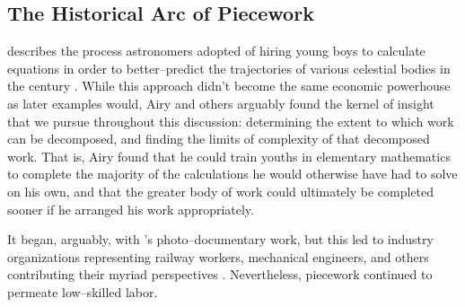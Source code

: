 \documentclass[trackingWork]{subfiles}
\begin{document}
\subsection{The Historical Arc of Piecework}\label{sec:pieceworkArc}
\citeauthor{grier2013computers} describes the process astronomers adopted of hiring young boys
to calculate equations in order
to better--predict the trajectories of various celestial bodies in the  century
\cite{grier2013computers}.
While this approach didn't become the same economic powerhouse as later examples would,
Airy  and others arguably found the kernel of insight that we pursue throughout this discussion:
determining the extent to which work can be decomposed, and
finding the limits of complexity of that decomposed work.
That is, Airy found that he could train youths in elementary mathematics
to complete the majority of the calculations he would otherwise have had to solve on his own,
and that the greater body of work could ultimately be completed sooner
if he arranged his work appropriately.





It began, arguably, with \citeauthor{riisOtherSideLives}'s photo--documentary work,
but this led to industry organizations representing
railway workers, mechanical engineers, and others contributing their myriad perspectives
\cite{american1921problem,richards1904anything,riisOtherSideLives}.
Nevertheless, piecework continued to permeate low--skilled labor.
\end{document}

